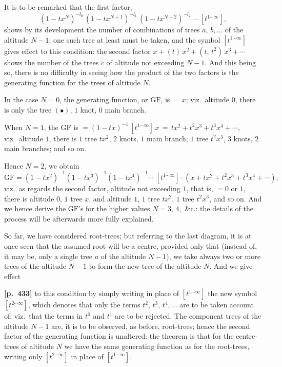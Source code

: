 \documentclass[11pt,a4paper]{article}
\providecommand{\GF}{\mathrm{GF}}
\begin{document}
It is to be remarked that the first factor,
\[
(1-tx^{N})^{-l_{0}}\,(1-tx^{N+1})^{-l_{1}}\,(1-tx^{N+2})^{-l_{2}}\,\cdots\;[t^{1\cdots\infty}],
\]
shows by its development the number of combinations of trees $a,\,b,\ldots$ of the altitude $N-1$; one such tree at least must be taken, and the symbol $[t^{1\cdots\infty}]$ gives effect to this condition: the second factor $x + (t)\,x^{2} + (t,\,t^{2})\,x^{3} + \cdots$ shows the number of the trees $c$ of altitude not exceeding $N-1$. And this being so, there is no difficulty in seeing how the product of the two factors is the generating function for the trees of altitude $N$.

In the case $N=0$, the generating function, or $\GF$, is $=x$; viz.\ altitude $0$, there is only the tree $(\bullet)$, $1$ knot, $0$ main branch.

When $N=1$, the $\GF$ is $=(1-tx)^{-1}\,[t^{1\cdots\infty}]\,x\,=\,tx^{2} + t^{2}x^{3} + t^{3}x^{4} + \cdots,$ viz.\ altitude $1$, there is $1$ tree $tx^{2}$, $2$ knots, $1$ main branch; $1$ tree $t^{2}x^{3}$, $3$ knots, $2$ main branches; and so on.

Hence $N=2$, we obtain
\[
\GF = (1-tx^{2})^{-1}(1-tx^{3})^{-1}(1-tx^{4})^{-1}\cdots\;[t^{1\cdots\infty}]\cdot(x + tx^{2} + t^{2}x^{3} + t^{3}x^{4} + \cdots);
\]
viz.\ as regards the second factor, altitude not exceeding $1$, that is, $=0$ or $1$, there is altitude $0$, $1$ tree $x$, and altitude $1$, $1$ tree $tx^{2}$, $1$ tree $t^{2}x^{3}$, and so on. And we hence derive the $\GF$'s for the higher values $N=3,\,4,$ \&c.: the details of the process will be afterwards more fully explained.

So far, we have considered root-trees; but referring to the last diagram, it is at once seen that the assumed root will be a centre, provided only that (instead of, it may be, only a single tree $a$ of the altitude $N-1$), we take always two or more trees of the altitude $N-1$ to form the new tree of the altitude $N$. And we give effect

\bigskip
\noindent\textbf{[p.~433]}\quad
to this condition by simply writing in place of $[t^{1\cdots\infty}]$ the new symbol $[t^{2\cdots\infty}]$, which denotes that only the terms $t^{2},\,t^{3},\,t^{4},\ldots$ are to be taken account of; viz.\ that the terms in $t^{0}$ and $t^{1}$ are to be rejected. The component trees of the altitude $N-1$ are, it is to be observed, as before, root-trees; hence the second factor of the generating function is unaltered: the theorem is that for the centre-trees of altitude $N$ we have the same generating function as for the root-trees, writing only $[t^{2\cdots\infty}]$ in place of $[t^{1\cdots\infty}]$.
\end{document}
